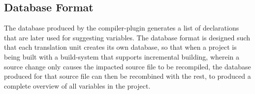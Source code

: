\subsection{Database Format}
The database produced by the compiler-plugin generates a list of declarations
that are later used for suggesting variables.
The database format is designed such that each translation unit creates its own
database, so that when a project is being built with a build-system that
supports incremental building, wherein a source change only causes the impacted
source file to be recompiled, the database produced for that source file can
then be recombined with the rest, to produced a complete overview of all
variables in the project.
